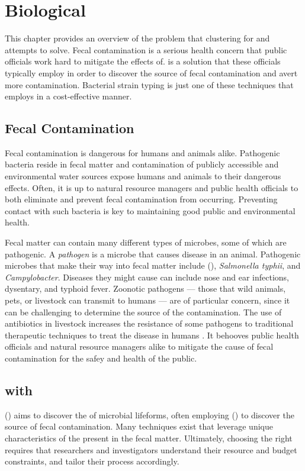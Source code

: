 \section{Biological}
\newcommand{\salmonellatyphii}{\textit{Salmonella typhii}}
\newcommand{\campylobacter}{\textit{Campylobacter}}

This chapter provides an overview of the problem that clustering for \bslong{} and \kraplong{} attempts to solve.
Fecal contamination is a serious health concern that public officials work hard to mitigate the effects of.
\MSTlong{} is a solution that these officials typically employ in order to discover the source of fecal contamination and avert more contamination.
Bacterial strain typing is just one of these techniques that \cploplong{} employs in a cost-effective manner.

\subsection{Fecal Contamination}
Fecal contamination is dangerous for humans and animals alike.
Pathogenic bacteria reside in fecal matter and contamination of publicly accessible and environmental water sources expose humans and animals to their dangerous effects.
Often, it is up to natural resource managers and public health officials to both eliminate and prevent fecal contamination from occurring.
Preventing contact with such bacteria is key to maintaining good public and environmental health.

Fecal matter can contain many different types of microbes, some of which are pathogenic.
A \textit{pathogen} is a microbe that causes disease in an animal.
Pathogenic microbes that make their way into fecal matter include \ecolilong{} (\ecoli{}), \salmonellatyphii{}, and \campylobacter{}.
Diseases they might cause can include nose and ear infections, dysentary, and typhoid fever.
Zoonotic pathogens --- those that wild animals, pets, or livestock can transmit to humans --- are of particular concern, since it can be challenging to determine the source of the contamination.
The use of antibiotics in livestock increases the resistance of some pathogens to traditional therapeutic techniques to treat the disease in humans \cite{rogers2005detecting}.
It behooves public health officials and natural resource managers alike to mitigate the cause of fecal contamination for the safey and health of the public.

\subsection{\MSTlong{} with \FIBlong{}}
\MSTlong{} (\mst{}) aims to discover the \spec{} of microbial lifeforms, often employing \FIBlong{} (\fib{}) to discover the source of fecal contamination.
Many techniques exist that leverage unique characteristics of the \fib{} present in the fecal matter.
Ultimately, choosing the right \fib{} requires that researchers and investigators understand their resource and budget constraints, and tailor their \mst{} process accordingly.

